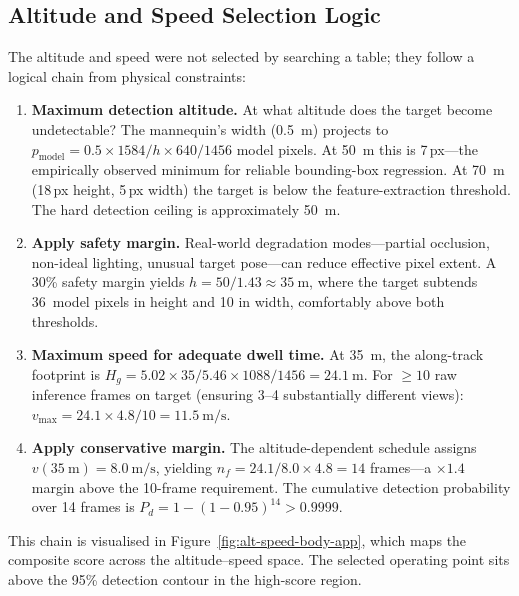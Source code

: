 \subsection{Altitude and Speed Selection Logic}\label{sec:opt-alt-speed}

The altitude and speed were not selected by searching a table; they follow a logical chain from physical constraints:

\begin{enumerate}
  \item \textbf{Maximum detection altitude.}
    At what altitude does the target become undetectable?
    The mannequin's width (\SI{0.5}{\metre}) projects to $p_{\mathrm{model}} = 0.5 \times 1584 / h \times 640/1456$ model pixels.
    At \SI{50}{\metre} this is 7\,px---the empirically observed minimum for reliable bounding-box regression.
    At \SI{70}{\metre} (18\,px height, 5\,px width) the target is below the feature-extraction threshold.
    The hard detection ceiling is approximately \SI{50}{\metre}.

  \item \textbf{Apply safety margin.}
    Real-world degradation modes---partial occlusion, non-ideal lighting, unusual target pose---can reduce effective pixel extent.
    A 30\% safety margin yields $h = 50 / 1.43 \approx \SI{35}{\metre}$, where the target subtends 36~model pixels in height and 10 in width, comfortably above both thresholds.

  \item \textbf{Maximum speed for adequate dwell time.}
    At \SI{35}{\metre}, the along-track footprint is $H_g = 5.02 \times 35 / 5.46 \times 1088/1456 = \SI{24.1}{\metre}$.
    For $\geq 10$ raw inference frames on target (ensuring 3--4 substantially different views): $v_{\max} = 24.1 \times 4.8 / 10 = \SI{11.5}{\metre\per\second}$.

  \item \textbf{Apply conservative margin.}
    The altitude-dependent schedule assigns $v(\SI{35}{\metre}) = \SI{8.0}{\metre\per\second}$, yielding $n_f = 24.1/8.0 \times 4.8 = 14$ frames---a $\times 1.4$ margin above the 10-frame requirement.
    The cumulative detection probability over 14 frames is $P_d = 1 - (1 - 0.95)^{14} > 0.9999$.
\end{enumerate}

This chain is visualised in Figure~\ref{fig:alt-speed-body-app}, which maps the composite score across the altitude--speed space.
The selected operating point sits above the 95\% detection contour in the high-score region.

